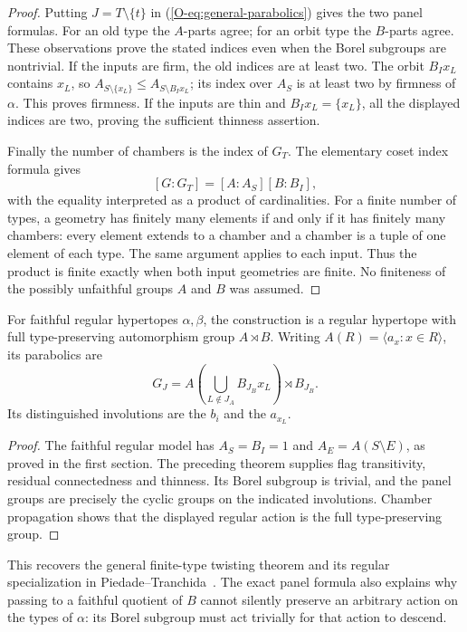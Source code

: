 \begin{proof}
Putting $J=T\setminus\{t\}$ in
(\ref{O-eq:general-parabolics}) gives the two panel formulas.
For an old type the $A$-parts agree; for an orbit type the $B$-parts
agree. These observations prove the stated indices even when the
Borel subgroups are nontrivial. If the inputs are firm, the old indices
are at least two. The orbit $B_Ix_L$ contains $x_L$, so
$A_{S\setminus\{x_L\}}\leq A_{S\setminus B_Ix_L}$; its index over
$A_S$ is at least two by firmness of $\alpha$. This proves firmness.
If the inputs are thin and $B_Ix_L=\{x_L\}$, all the displayed
indices are two, proving the sufficient thinness assertion.

Finally the number of chambers is the index of $G_T$. The elementary
coset index formula gives
\[
 [G:G_T]=[A:A_S][B:B_I],
\]
with the equality interpreted as a product of cardinalities.
For a finite number of types, a geometry has finitely many elements
if and only if it has finitely many chambers: every element extends
to a chamber and a chamber is a tuple of one element of each type.
The same argument applies to each input. Thus the product is finite
exactly when both input geometries are finite. No finiteness of the
possibly unfaithful groups $A$ and $B$ was assumed.
\end{proof}

\begin{corollary}\label{O-thm:twist}
For faithful regular hypertopes $\alpha,\beta$, the construction is a
regular hypertope with full type-preserving automorphism group $A\rtimes B$.
Writing $A(R)=\langle a_x:x\in R\rangle$, its parabolics are
\begin{equation}\label{O-eq:regular-support}
 G_J=A\!\left(\bigcup_{L\notin J_A}B_{J_B}x_L\right)\rtimes B_{J_B}.
\end{equation}
Its distinguished involutions are the $b_i$ and the $a_{x_L}$.
\end{corollary}
\begin{proof}
The faithful regular model has $A_S=B_I=1$ and
$A_E=A(S\setminus E)$, as proved in the first section. The preceding
theorem supplies flag transitivity, residual connectedness and thinness.
Its Borel subgroup is trivial, and the panel groups are precisely the
cyclic groups on the indicated involutions. Chamber propagation shows
that the displayed regular action is the full type-preserving group.
\end{proof}
This recovers the general finite-type twisting theorem and its regular
specialization in Piedade--Tranchida~\cite[Theorem 3.16 and Corollary 3.17]{N006}.
The exact panel formula also explains why passing to a faithful quotient
of $B$ cannot silently preserve an arbitrary action on the types of
$\alpha$: its Borel subgroup must act trivially for that action to descend.
